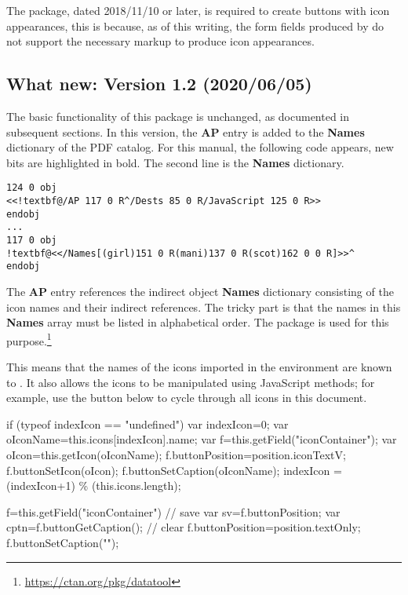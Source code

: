 \documentclass{article}
\def\mpFmt{\raggedleft\itshape\small}
\begin{document}
\newtopic\noindent
The \marginpar{\mpFmt\pkg{eforms} package
required} package, dated 2018/11/10 or later, is required to create buttons
with icon appearances, this is because, as of this writing, the form fields
produced by  do not support the necessary markup to produce
icon appearances.

\subsection{What new: Version 1.2 (2020/06/05)}

The basic functionality of this package is unchanged, as documented in
subsequent sections. In this version, the \textbf{\textsf{AP}} entry is added
to the \textbf{\textsf{Names}} dictionary of the PDF catalog. For this manual,
the following code appears, new bits are highlighted in bold. The second line
is the \textbf{\textsf{Names}} dictionary.
\begin{Verbatim}[commandchars={!@^}]
124 0 obj
<<!textbf@/AP 117 0 R^/Dests 85 0 R/JavaScript 125 0 R>>
endobj
...
117 0 obj
!textbf@<</Names[(girl)151 0 R(mani)137 0 R(scot)162 0 0 R]>>^
endobj
\end{Verbatim}
The \textbf{\textsf{AP}} entry
references the indirect object \textbf{\textsf{Names}} dictionary consisting
of the icon names and their indirect references. The tricky part is that
the names in this \textbf{\textsf{Names}} array must be listed in alphabetical
order. The  package is used for this purpose.\footnote{\url{https://ctan.org/pkg/datatool}}

This means that the names of the icons imported in the 
environment are known to . It also allows the icons
to be manipulated using JavaScript methods; for example, use the button below
to cycle through all icons in this document.

\begin{defineJS}{\cycleJS}
if (typeof indexIcon == "undefined") var indexIcon=0;
var oIconName=this.icons[indexIcon].name;
var f=this.getField("iconContainer");
var oIcon=this.getIcon(oIconName);
f.buttonPosition=position.iconTextV;
f.buttonSetIcon(oIcon);
f.buttonSetCaption(oIconName);
indexIcon = (indexIcon+1) \% (this.icons.length);
\end{defineJS}

\begin{defineJS}{\clearJS}
f=this.getField("iconContainer")
// save
var sv=f.buttonPosition;
var cptn=f.buttonGetCaption();
// clear
f.buttonPosition=position.textOnly;
f.buttonSetCaption("");
\end{defineJS}
\end{document}
